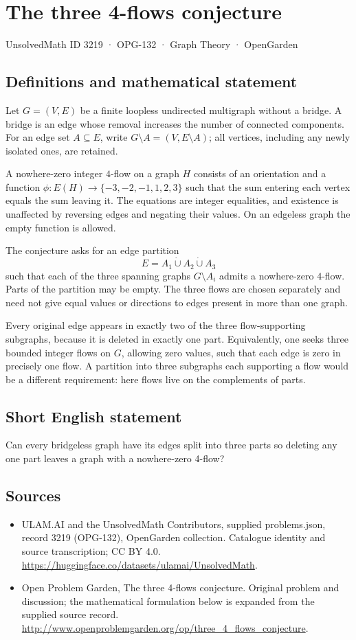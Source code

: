 \documentclass[11pt,a4paper]{article}
\begin{document}
\section*{The three 4-flows conjecture}\label{3219}
{\small UnsolvedMath ID 3219 · OPG-132 · Graph Theory · OpenGarden}
\subsection{Definitions and mathematical statement}
Let $G=(V,E)$ be a finite loopless
undirected multigraph without a
bridge. A bridge is an edge
whose removal increases the
number of connected components.
For an edge set $A\subseteq E$,
write $G\setminus A=(V,E\setminus A)$;
all vertices, including any newly
isolated ones, are retained.

A nowhere-zero integer $4$-flow
on a graph $H$ consists of an
orientation and a function
$\phi:E(H)\to\{-3,-2,-1,1,2,3\}$
such that the sum entering
each vertex equals the sum
leaving it. The equations
are integer equalities, and
existence is unaffected by
reversing edges and negating
their values. On an edgeless
graph the empty function is
allowed.

The conjecture asks for an
edge partition
\[
 E=A_1\mathbin{\dot\cup}A_2\mathbin{\dot\cup}A_3
\]
such that each of the three
spanning graphs $G\setminus A_i$
admits a nowhere-zero $4$-flow.
Parts of the partition may
be empty. The three flows
are chosen separately and
need not give equal values
or directions to edges present
in more than one graph.

Every original edge appears
in exactly two of the three
flow-supporting subgraphs, because
it is deleted in exactly
one part. Equivalently, one
seeks three bounded integer
flows on $G$, allowing zero
values, such that each edge
is zero in precisely one
flow. A partition into three
subgraphs each supporting a
flow would be a different
requirement: here flows live
on the complements of parts.
\subsection{Short English statement}
Can every bridgeless graph have its edges split into three parts so deleting any one part leaves a graph with a nowhere-zero 4-flow?
\subsection{Sources}
\begin{itemize}
\item[S1] ULAM.AI and the UnsolvedMath Contributors, supplied problems.json, record 3219 (OPG-132), OpenGarden collection. Catalogue identity and source transcription; CC BY 4.0.
\url{https://huggingface.co/datasets/ulamai/UnsolvedMath}.
\item[S2] Open Problem Garden, The three 4-flows conjecture. Original problem and discussion; the mathematical formulation below is expanded from the supplied source record.
\url{http://www.openproblemgarden.org/op/three_4_flows_conjecture}.
\end{itemize}
\end{document}
